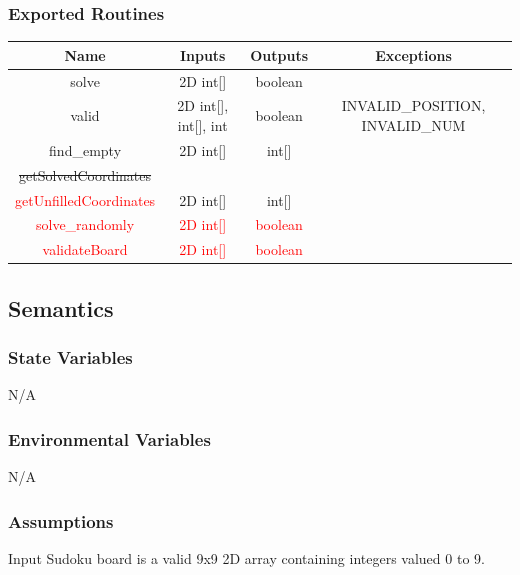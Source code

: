 \documentclass[11pt]{article}
\begin{document}
		\subsubsection{Exported Routines}
		\begin{tabular}[width=\textwidth, pos]{|c|c|c|c|}
			
			\hline
			\textbf{Name}& \textbf{Inputs} & \textbf{Outputs} & \textbf{Exceptions} \\ \hline
			solve & 2D int[] & boolean &  \\
			valid & 2D int[], int[], int & boolean & INVALID\_POSITION, INVALID\_NUM \\ 
			find\_empty & 2D int[] & int[] &  \\ 
			\sout{getSolvedCoordinates} & & & \\ 
			\textcolor{red}{getUnfilledCoordinates} & 2D int[] & int[] & \\
			\textcolor{red}{solve\_randomly} & \textcolor{red}{2D int[]} & \textcolor{red}{boolean} & \\
			\textcolor{red}{validateBoard} & \textcolor{red}{2D int[]} & \textcolor{red}{boolean} & \\
			\hline
			
		\end{tabular}
		
		\subsection{Semantics}
		\subsubsection{State Variables}
		N/A
		
		\subsubsection{Environmental Variables}
		N/A
		
		\subsubsection{Assumptions}
		Input Sudoku board is a valid 9x9 2D array containing integers valued 0 to 9.
		
\end{document}
